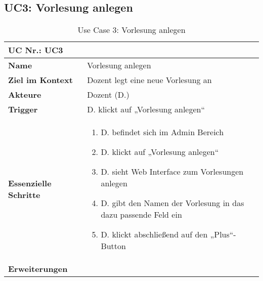 \begin{table}[h]
\subsection{UC3: Vorlesung anlegen}\label{uc:UC3}
	\begin{tabular}{|p{3cm}|p{11.06cm}|}
	\hline
		\multicolumn{2}{|l|}{\textbf{UC Nr.: UC3} }   \\ \hline
		\textbf{Name}                 &     Vorlesung anlegen    \\ \hline
		\textbf{Ziel im Kontext}      &     Dozent legt eine neue Vorlesung an   \\ \hline
		\textbf{Akteure}              &     Dozent (D.)    \\ \hline
		\textbf{Trigger}              &     D. klickt auf „Vorlesung anlegen“    \\ \hline
		\textbf{Essenzielle Schritte} & 
			\begin{enumerate}
			  \item D. befindet sich im Admin Bereich
			  \item D. klickt auf „Vorlesung anlegen“
			  \item D. sieht Web Interface zum Vorlesungen anlegen
			  \item D. gibt den Namen der Vorlesung in das dazu passende Feld ein
			  \item D. klickt abschließend auf den „Plus“-Button
			\end{enumerate}
		\\ \hline
		\textbf{Erweiterungen} 		  &         \\ \hline
	\end{tabular}
	\caption{Use Case 3: Vorlesung anlegen}
\end{table}\FloatBarrier



